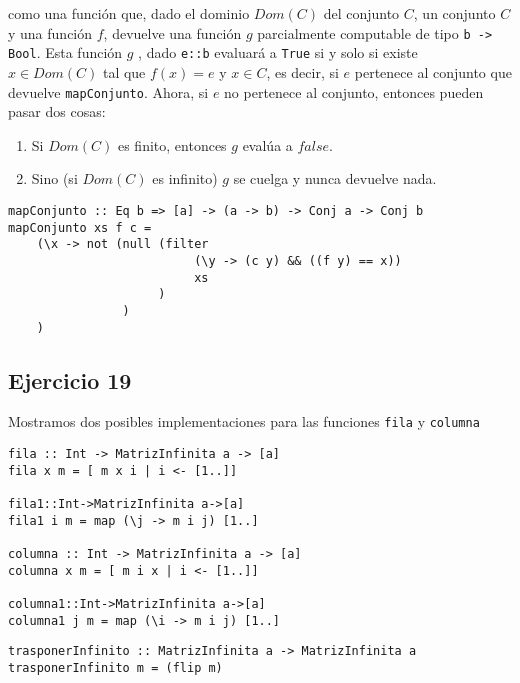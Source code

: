 como una función que, dado el dominio $Dom(C)$ del conjunto $C$, un conjunto $C$ y una función $f$, devuelve una función $g$ parcialmente computable de tipo \texttt{b -> Bool}. Esta función $g$ , dado \texttt{e::b} evaluará a \texttt{True} si y solo si existe $x\in Dom(C)$ tal que $f(x) = e$ y $x\in C$, es decir, si $e$ pertenece al conjunto que devuelve \texttt{mapConjunto}. Ahora, si $e$ no pertenece al conjunto, entonces pueden pasar dos cosas:
\begin{enumerate}
    \item Si $Dom(C)$ es finito, entonces $g$ evalúa a $false$.
    \item Sino (si $Dom(C)$ es infinito) $g$ se cuelga y nunca devuelve nada.
\end{enumerate}

\begin{centrado}
    \begin{verbatim}
mapConjunto :: Eq b => [a] -> (a -> b) -> Conj a -> Conj b
mapConjunto xs f c = 
    (\x -> not (null (filter 
                          (\y -> (c y) && ((f y) == x)) 
                          xs
                     )
                )
    )
    \end{verbatim}
\end{centrado}

\subsection{Ejercicio 19}
Mostramos dos posibles implementaciones para las funciones \texttt{fila} y \texttt{columna}
\begin{centrado}
    \begin{verbatim}
fila :: Int -> MatrizInfinita a -> [a]
fila x m = [ m x i | i <- [1..]]

fila1::Int->MatrizInfinita a->[a]
fila1 i m = map (\j -> m i j) [1..]

columna :: Int -> MatrizInfinita a -> [a]
columna x m = [ m i x | i <- [1..]]

columna1::Int->MatrizInfinita a->[a]
columna1 j m = map (\i -> m i j) [1..]
    \end{verbatim}
\end{centrado}

\begin{centrado}
    \begin{verbatim}
trasponerInfinito :: MatrizInfinita a -> MatrizInfinita a
trasponerInfinito m = (flip m)
    \end{verbatim}
\end{centrado}


